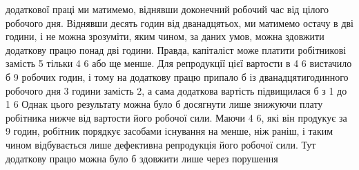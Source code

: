 додаткової праці ми матимемо, віднявши доконечний робочий
час від цілого робочого дня. Віднявши десять годин від дванадцятьох,
ми матимемо остачу в дві години, і не можна зрозуміти,
яким чином, за даних умов, можна здовжити додаткову
працю понад дві години. Правда, капіталіст може платити робітникові
замість 5 тільки 4 6 або ще менше.
Для репродукції цієї вартости в 4 6 вистачило б
9 робочих годин, і тому на додаткову працю припало б із дванадцятигодинного
робочого дня 3 години замість 2, а сама додаткова
вартість підвищилася б з 1 до 1 6 Однак
цього результату можна було б досягнути лише знижуючи плату
робітника нижче від вартости його робочої сили. Маючи 4
6, які він продукує за 9 годин, робітник порядкує
засобами існування на  менше, ніж раніш, і таким чином відбувається
лише дефективна репродукція його робочої сили. Тут
додаткову працю можна було б здовжити лише через порушення
\parbreak{}  %
